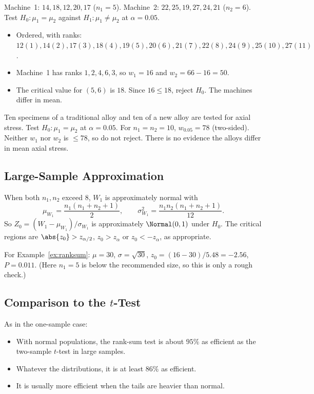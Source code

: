 \begin{example}\label{ex:ranksum}
Machine~1: $14,18,12,20,17$ ($n_1=5$). Machine~2: $22,25,19,27,24,21$ ($n_2=6$). Test $H_0:\mu_1=\mu_2$ against $H_1:\mu_1\ne\mu_2$ at $\alpha=0.05$.
\begin{itemize}
  \item Ordered, with ranks: $12(1),14(2),17(3),18(4),19(5),20(6),21(7),22(8),24(9),25(10),27(11)$.
  \item Machine~1 has ranks $1,2,4,6,3$, so $w_1=16$ and $w_2=66-16=50$.
  \item The critical value for $(5,6)$ is $18$. Since $16\le18$, reject $H_0$. The machines differ in mean.
\end{itemize}
\end{example}

\begin{example}
Ten specimens of a traditional alloy and ten of a new alloy are tested for axial stress. Test $H_0:\mu_1=\mu_2$ at $\alpha=0.05$. For $n_1=n_2=10$, $w_{0.05}=78$ (two-sided). Neither $w_1$ nor $w_2$ is $\le78$, so do not reject. There is no evidence the alloys differ in mean axial stress.
\end{example}

\subsection{Large-Sample Approximation}

When both $n_1,n_2$ exceed $8$, $W_1$ is approximately normal with
\[ \mu_{W_1}=\frac{n_1(n_1+n_2+1)}2,\qquad\sigma^2_{W_1}=\frac{n_1n_2(n_1+n_2+1)}{12}. \]
So $Z_0=(W_1-\mu_{W_1})/\sigma_{W_1}$ is approximately $\Normal(0,1)$ under $H_0$. The critical regions are $\abs{z_0}>z_{\alpha/2}$, $z_0>z_\alpha$ or $z_0<-z_\alpha$, as appropriate.

For Example~\ref{ex:ranksum}: $\mu=30$, $\sigma=\sqrt{30}$, $z_0=(16-30)/5.48=-2.56$, $P=0.011$. (Here $n_1=5$ is below the recommended size, so this is only a rough check.)

\subsection{Comparison to the $t$-Test}

As in the one-sample case:
\begin{itemize}
  \item With normal populations, the rank-sum test is about $95\%$ as efficient as the two-sample $t$-test in large samples.
  \item Whatever the distributions, it is at least $86\%$ as efficient.
  \item It is usually more efficient when the tails are heavier than normal.
\end{itemize}

